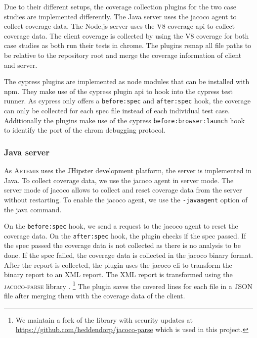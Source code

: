 Due to their different setups, the coverage collection plugins for the two case studies are implemented differently.
The Java server uses the jacoco agent to collect coverage data.
The Node.js server uses the V8 coverage \ac{api} to collect coverage data.
The client coverage is collected by using the V8 coverage for both case studies as both run their tests in chrome.
The plugins remap all file paths to be relative to the repository root and merge the coverage information of client and server.

The cypress plugins are implemented as node modules that can be installed with npm.
They make use of the cypress plugin \ac{api} \autocite{cypressio_writing_nodate} to hook into the cypress test runner.
As cypress only offers a \texttt{before:spec} and \texttt{after:spec} hook, the coverage can only be collected for each spec file instead of each individual test case.
Additionally the plugins make use of the cypress \texttt{before:browser:launch} hook to identify the port of the chrom debugging protocol.
\subsubsection{Java server}
As \textsc{Artemis} uses the JHipster \autocite{jhipster_jhipster_nodate} development platform, the server is implemented in Java.
To collect coverage data, we use the jacoco agent \autocite{noauthor_jacoco_nodate} in server mode.
The server mode of jacoco allows to collect and reset coverage data from the server without restarting.
To enable the jacoco agent, we use the \texttt{-javaagent} option of the java command.

On the \texttt{before:spec} hook, we send a request to the jacoco agent to reset the coverage data.
On the \texttt{after:spec} hook, the plugin checks if the spec passed.
If the spec passed the coverage data is not collected as there is no analysis to be done.
If the spec failed, the coverage data is collected in the jacoco binary format.
After the report is collected, the plugin uses the jacoco \ac{cli} to transform the binary report to an XML report.
The XML report is transformed using the \textsc{jacoco-parse} library \autocite{noauthor_jacoco-parse_2023}.
\footnote{We maintain a fork of the library with security updates at \url{https://github.com/heddendorp/jacoco-parse} which is used in this project.}
The plugin saves the covered lines for each file in a JSON file after merging them with the coverage data of the client.

